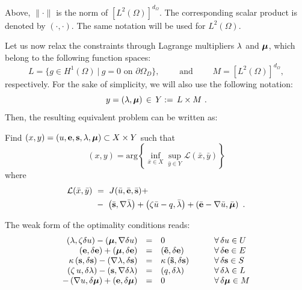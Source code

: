 \begin{remark}
	Above, $\|\cdot\|$ is the norm of $\left[L^2(\Omega)\right]^{d_{\Omega}}$. The corresponding scalar product is denoted by $\left ( \cdot , \cdot \right )$. The same notation will be used for $L^2(\Omega)$.
\end{remark}
Let us now relax the constraints through Lagrange multipliers $\lambda$ and $\boldsymbol{\mu}$, which belong to the following function spaces:
\begin{equation*}
	L=\{g\in H^1(\Omega)~|~g=0 \mbox{ on } \partial \Omega_D\},\qquad
	\mbox{ and }\qquad M=\left[L^2(\Omega)\right]^{d_{\Omega}},  
\end{equation*}
respectively. For the sake of simplicity, we will also use the following notation:
\begin{equation}
	y=\left (\lambda,\boldsymbol{\mu}\right )\,\in \, Y:=\,L\times M~.
\end{equation}
Then, the resulting equivalent problem can be written as: 
\begin{tcolorbox}[colback=black!10!white, halign = justify, boxrule=0pt]
	\begin{problem*}[P2]
		Find $(x,y)=\left( u, \mathbf{e}, \mathbf{s}, \lambda, \boldsymbol{\mu} \right) \subset X\times Y$ such that 
		\begin{equation}
			(x,y)= \mbox{arg} \left \{ \inf_{\bar{x}\in X} \sup_{\bar{y}\in Y} 
			\mathcal{L}(\bar{x},\bar{y})
			\right \}
		\end{equation}
		where
		\begin{equation}
			\begin{aligned}
				\mathcal{L}(\bar{x},\bar{y}) &~=~J(\bar{u},\bar{\mathbf{e}},\bar{\mathbf{s}})+ \nonumber \\
				&~-~\left ( \bar{\mathbf{s}},\nabla \bar{\lambda} \right ) + \left (\zeta \bar{u} - q , \bar{\lambda} \right )  
				+ \left ( \bar{\mathbf{e}}-\nabla \bar{u}, \bar{\boldsymbol{\mu}} \right ) ~.
			\end{aligned} \label{eq:lagrangian}
		\end{equation}
	\end{problem*}
\end{tcolorbox}
The weak form of the optimality conditions reads:
\begin{equation}\label{eq:variational_form}
	\begin{array}{rcll}
		\left ( \lambda, \zeta \delta u \right ) - \left ( \boldsymbol{\mu}, \nabla \delta u \right ) & = & 0 &\qquad \forall \,\delta u \in U \\
		\left ( \mathbf{e}, \delta \mathbf{e} \right ) + \left ( \boldsymbol{\mu}, \delta \mathbf{e} \right ) &=& \left ( \mathbf{\tilde{e}}, \delta \mathbf{e} \right )  &\qquad \forall \,\delta \mathbf{e} \in E\\
		\kappa \left ( \mathbf{s}, \delta \mathbf{s} \right ) - \left ( \nabla \lambda, \delta \mathbf{s} \right )  & = & \kappa \left ( \mathbf{\tilde{s}},\delta \mathbf{s} \right ) &\qquad \forall\, \delta \mathbf{s} \in S \\
		\left ( \zeta \,u, \delta \lambda \right )-\left ( \mathbf{s}, \nabla \delta \lambda \right )  &=& \left ( q, \delta \lambda \right ) 	&\qquad \forall\,\delta \lambda \in L\\
		-\left (\nabla u,\delta \boldsymbol{\mu} \right ) + \left ( \mathbf{e}, \delta \boldsymbol{\mu} \right ) & = & 0 &\qquad \forall \, \delta \boldsymbol{\mu} \in M 
	\end{array}
\end{equation}

